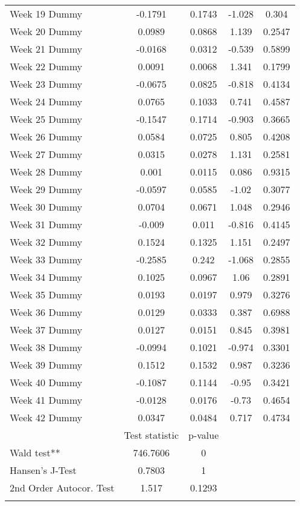 \begin{longtable}{lcccc}
  Week 19 Dummy & -0.1791 & 0.1743 & -1.028 & 0.304 \\ 
  Week 20 Dummy & 0.0989 & 0.0868 & 1.139 & 0.2547 \\ 
  Week 21 Dummy & -0.0168 & 0.0312 & -0.539 & 0.5899 \\ 
  Week 22 Dummy & 0.0091 & 0.0068 & 1.341 & 0.1799 \\ 
  Week 23 Dummy & -0.0675 & 0.0825 & -0.818 & 0.4134 \\ 
  Week 24 Dummy & 0.0765 & 0.1033 & 0.741 & 0.4587 \\ 
  Week 25 Dummy & -0.1547 & 0.1714 & -0.903 & 0.3665 \\ 
  Week 26 Dummy & 0.0584 & 0.0725 & 0.805 & 0.4208 \\ 
  Week 27 Dummy & 0.0315 & 0.0278 & 1.131 & 0.2581 \\ 
  Week 28 Dummy & 0.001 & 0.0115 & 0.086 & 0.9315 \\ 
  Week 29 Dummy & -0.0597 & 0.0585 & -1.02 & 0.3077 \\ 
  Week 30 Dummy & 0.0704 & 0.0671 & 1.048 & 0.2946 \\ 
  Week 31 Dummy & -0.009 & 0.011 & -0.816 & 0.4145 \\ 
  Week 32 Dummy & 0.1524 & 0.1325 & 1.151 & 0.2497 \\ 
  Week 33 Dummy & -0.2585 & 0.242 & -1.068 & 0.2855 \\ 
  Week 34 Dummy & 0.1025 & 0.0967 & 1.06 & 0.2891 \\ 
  Week 35 Dummy & 0.0193 & 0.0197 & 0.979 & 0.3276 \\ 
  Week 36 Dummy & 0.0129 & 0.0333 & 0.387 & 0.6988 \\ 
  Week 37 Dummy & 0.0127 & 0.0151 & 0.845 & 0.3981 \\ 
  Week 38 Dummy & -0.0994 & 0.1021 & -0.974 & 0.3301 \\ 
  Week 39 Dummy & 0.1512 & 0.1532 & 0.987 & 0.3236 \\ 
  Week 40 Dummy & -0.1087 & 0.1144 & -0.95 & 0.3421 \\ 
  Week 41 Dummy & -0.0128 & 0.0176 & -0.73 & 0.4654 \\ 
  Week 42 Dummy & 0.0347 & 0.0484 & 0.717 & 0.4734 \\ 
   & Test statistic & p-value &  &  \\ 
  Wald test** & 746.7606 & 0 &  &  \\ 
  Hansen's J-Test & 0.7803 & 1 &  &  \\ 
  2nd Order Autocor. Test & 1.517 & 0.1293 &  &  \\ 
   \bottomrule
\caption{Results of two-step GMM estimation of policy, behavior and information on %
\label{tab_results:deaths_spec_8_full}
\end{longtable}
\endgroup

